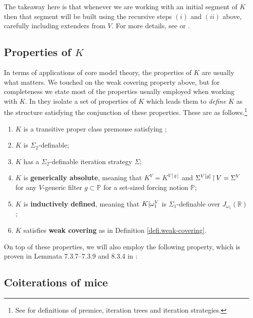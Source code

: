 \documentclass[../../main]{subfiles}
\begin{document}
\qquad The takeaway here is that whenever we are working with an initial segment of $K$ then that segment will be built using the recursive steps $(i)$ and $(ii)$ above, carefully including extenders from $V$. For more details, see \cite{JensenSteel} or \cite{MSc}.

\subsection{Properties of $K$}

In terms of applications of core model theory, the properties of $K$ are usually what matters. We touched on the weak covering property above, but for completeness we state most of the properties usually employed when working with $K$. In \cite{JensenSteel} they isolate a set of properties of $K$ which leads them to \textit{define} $K$ as the structure satisfying the conjunction of these properties. These are as follows.\footnote{See \cite{steel2010outline} for definitions of premice, iteration trees and iteration strategies.}

\begin{enumerate}
  \item $K$ is a transitive proper class premouse satisfying \zfc;
  \item $K$ is $\Sigma_2$-definable;
  \item $K$ has a $\Sigma_2$-definable iteration strategy $\Sigma$;
  \item $K$ is \textbf{generically absolute}, meaning that $K^V=K^{V[g]}$ and $\Sigma^{V[g]}\operatorname{\upharpoonright} V=\Sigma^V$ for any $V$-generic filter $g\subset\mathbb P$ for a set-sized forcing notion $\mathbb P$;
  \item $K$ is \textbf{inductively defined}, meaning that $K|\omega_1^V$ is $\Sigma_1$-definable over $J_{\omega_1}(\mathbb R)$;
  \item $K$ satisfies \textbf{weak covering} as in Definition \ref{defi.weak-covering}.\\
\end{enumerate}

On top of these properties, we will also employ the following property, which is proven in Lemmata 7.3.7--7.3.9 and 8.3.4 in \cite{Zeman}:


\subsection{Coiterations of mice}
\end{document}
